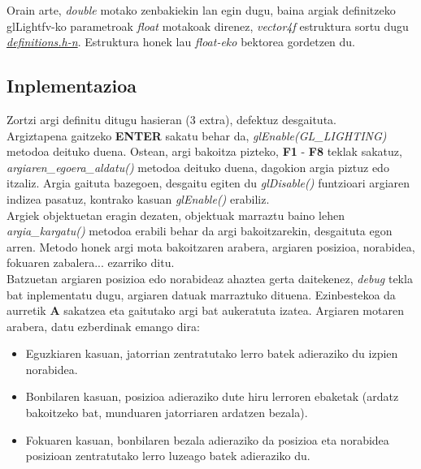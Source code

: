 \documentclass[12pt]{article}
\newcommand{\fitxategi}[1] {\underline{\textit{#1}}}
\newcommand{\metodo}[1] {\textit{#1}}
\newcommand{\aldagai}[1] {\textit{#1}}
\newcommand{\tekla}[1] {\textbf{#1}}
\begin{document}
Orain arte, \aldagai{double} motako zenbakiekin lan egin dugu, baina argiak definitzeko glLightfv-ko parametroak \aldagai{float} motakoak direnez, \aldagai{vector4f} estruktura sortu dugu \fitxategi{definitions.h-n}. Estruktura honek lau \aldagai{float-eko} bektorea gordetzen du.\\


\subsection{Inplementazioa}

Zortzi argi definitu ditugu hasieran (3 extra), defektuz desgaituta.\\
Argiztapena gaitzeko \tekla{ENTER} sakatu behar da, \metodo{glEnable(GL\_LIGHTING)} metodoa deituko duena. Ostean, argi bakoitza pizteko, \tekla{F1} - \tekla{F8} teklak sakatuz, \metodo{argiaren\_egoera\_aldatu()} metodoa deituko duena, dagokion argia piztuz edo itzaliz. Argia gaituta bazegoen, desgaitu egiten du \metodo{glDisable()} funtzioari argiaren indizea pasatuz, kontrako kasuan \metodo{glEnable()} erabiliz.\\

Argiek objektuetan eragin dezaten, objektuak marraztu baino lehen \metodo{argia\_kargatu()} metodoa erabili behar da argi bakoitzarekin, desgaituta egon arren. Metodo honek argi mota bakoitzaren arabera, argiaren posizioa, norabidea, fokuaren zabalera... ezarriko ditu.\\

Batzuetan argiaren posizioa edo norabideaz ahaztea gerta daitekenez, \textit{debug} tekla bat inplementatu dugu, argiaren datuak marraztuko dituena. Ezinbestekoa da aurretik \tekla{A} sakatzea eta gaitutako argi bat aukeratuta izatea. Argiaren motaren arabera, datu ezberdinak emango dira:

\begin{itemize}

\item Eguzkiaren kasuan, jatorrian zentratutako lerro batek adieraziko du izpien norabidea.

\item Bonbilaren kasuan, posizioa adieraziko dute hiru lerroren ebaketak (ardatz bakoitzeko bat, munduaren jatorriaren ardatzen bezala).

\item Fokuaren kasuan, bonbilaren bezala adieraziko da posizioa eta norabidea posizioan zentratutako lerro luzeago batek adieraziko du.

\end{itemize}
\end{document}
